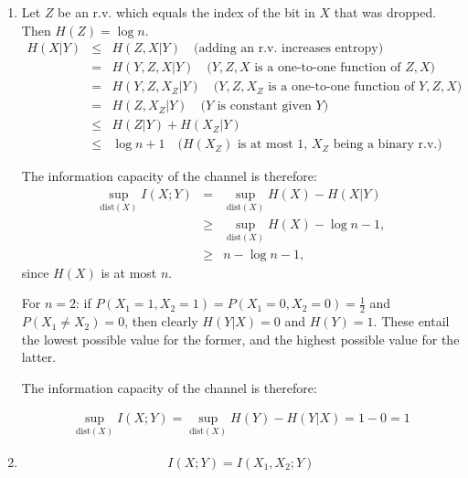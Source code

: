 \documentclass[11pt]{article} \usepackage{amssymb}
\newcommand{\half}{{\textstyle \frac12}}
\begin{document}
\begin{enumerate}
\item

Let $Z$ be an r.v. which equals the index of the bit in $X$ that was
dropped. Then $H(Z)=\log n$. 
\begin{eqnarray*}
  H(X|Y)&\leq& H(Z,X|Y) 
\quad\mbox{(adding an r.v. increases entropy)}
\\      &=&H(Y,Z,X|Y)   
\quad\mbox{($Y,Z,X$ is a one-to-one function of $Z,X$)}
\\      &=&H(Y,Z,X_Z|Y) 
\quad\mbox{($Y,Z,X_Z$ is a one-to-one function of $Y,Z,X$)}
\\      &=&H(Z, X_Z|Y)
\quad\mbox{($Y$ is constant given $Y$)}
\\      &\leq&H(Z|Y)+H(X_Z|Y)
\\      &\leq& \log n + 1
\quad\mbox{($H(X_Z)$ is at most 1, $X_Z$ being a binary r.v.)}
\end{eqnarray*}

The information capacity of the channel is therefore:
\begin{eqnarray*}
  \sup_{\mbox{dist}(X)}I(X;Y)&=&\sup_{\mbox{dist}(X)}H(X)-H(X|Y)
\\                        &\geq&\sup_{\mbox{dist}(X)}H(X)-\log n - 1,
\\                        &\geq&n-\log n - 1,
\end{eqnarray*}
since $H(X)$ is at most $n$.

For $n=2$: if $P(X_1=1,X_2=1)=P(X_1=0,X_2=0)=\half$ and $P(X_1\not=X_2)=0$,
then clearly $H(Y|X)=0$ and $H(Y)=1$. These entail the lowest possible value
for the former, and the highest possible value for the latter.

The information capacity of the channel is therefore:

\begin{eqnarray*}
  \sup_{\mbox{dist}(X)}I(X;Y)=\sup_{\mbox{dist}(X)}H(Y)-H(Y|X)=1-0=1
\end{eqnarray*}

\item
  \begin{eqnarray*}
    I(X;Y)=I(X_1,X_2;Y)
  \end{eqnarray*}
\end{enumerate}
\end{document}
